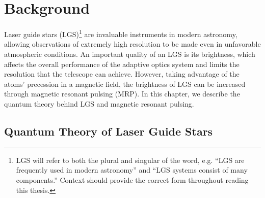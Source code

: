 \chapter{Background}
Laser guide stars (LGS)\footnote{LGS will refer to both the plural and singular of the word, e.g. ``LGS are frequently used in modern astronomy'' and ``LGS systems consist of many components.'' Context should provide the correct form throughout reading this thesis.}  are invaluable instruments in modern astronomy, allowing observations of extremely high resolution to be made even in unfavorable atmospheric conditions. An important quality of an LGS is its brightness, which affects the overall performance of the adaptive optics system and limits the resolution that the telescope can achieve. However, taking advantage of the atoms' precession in a magnetic field, the brightness of LGS can be increased through magnetic resonant pulsing (MRP). In this chapter, we describe the quantum theory behind LGS and magnetic resonant pulsing.

\section{Quantum Theory of Laser Guide Stars}


